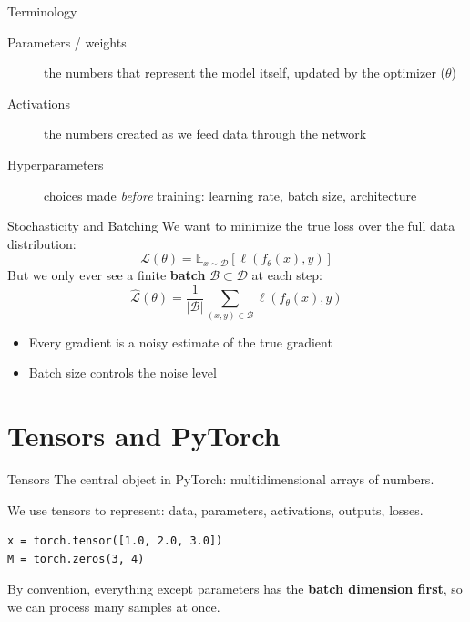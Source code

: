 \documentclass[aspectratio=169]{beamer}
\begin{document}
\begin{frame}{Terminology}
\begin{description}
\item[Parameters / weights] the numbers that represent the model itself, updated by the optimizer ($\theta$)
\item[Activations] the numbers created as we feed data through the network
\item[Hyperparameters] choices made \emph{before} training: learning rate, batch size, architecture
\end{description}
\end{frame}

\begin{frame}{Stochasticity and Batching}
We want to minimize the true loss over the full data distribution:
$$\mathcal{L}(\theta) = \mathbb{E}_{x \sim \mathcal{D}} \left[ \ell(f_\theta(x), y) \right]$$
But we only ever see a finite \textbf{batch} $\mathcal{B} \subset \mathcal{D}$ at each step:
$$\hat{\mathcal{L}}(\theta) = \frac{1}{|\mathcal{B}|} \sum_{(x,y) \in \mathcal{B}} \ell(f_\theta(x), y)$$
\begin{itemize}
\item Every gradient is a noisy estimate of the true gradient
\item Batch size controls the noise level
\end{itemize}
\end{frame}

\section{Tensors and PyTorch}

\begin{frame}[fragile]{Tensors}
The central object in PyTorch: multidimensional arrays of numbers.
\vspace{0.5em}

We use tensors to represent: data, parameters, activations, outputs, losses.
\vspace{0.5em}

\begin{verbatim}
x = torch.tensor([1.0, 2.0, 3.0])
M = torch.zeros(3, 4)
\end{verbatim}
\vspace{0.5em}

By convention, everything except parameters has the \textbf{batch dimension first}, so we can process many samples at once.
\end{frame}
\end{document}
